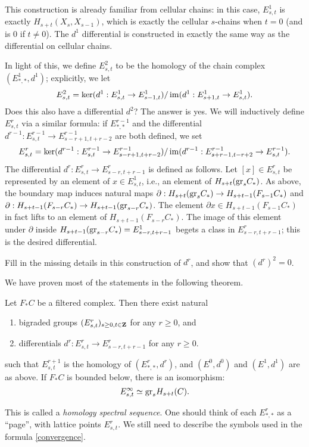 This construction is already familiar from cellular chains: in this case,
$E^1_{s,t}$ is exactly $H_{s+t}(X_{s},X_{s-1})$, which is exactly the cellular
$s$-chains when $t=0$ (and is $0$ if $t\neq 0$). The $d^1$ differential is
constructed in exactly the same way as the differential on cellular chains.

In light of this, we define $E^2_{s,t}$ to be the homology of the chain complex
$(E^1_{\ast,\ast}, d^1)$; explicitly, we let
$$E^2_{s,t} = \ker(d^1:E^1_{s,t}\to E^1_{s-1,t})/\operatorname{im}(d^1:E^1_{s+1,t}\to
E^1_{s,t}).$$
Does this also have a differential $d^2$? The answer is yes. We will
inductively define $E^r_{s,t}$ via a similar formula: if $E^{r-1}_{\ast,\ast}$
and the differential $d^{r-1}:E^{r-1}_{s,t}\to E^{r-1}_{s-r+1,t+r-2}$ are both
defined, we set
$$E^{r}_{s,t} = \ker(d^{r-1}:E^{r-1}_{s,t}\to
E^{r-1}_{s-r+1,t+r-2})/\operatorname{im}(d^{r-1}:E^{r-1}_{s+r-1,t-r+2}\to E^{r-1}_{s,t}).$$
The differential $d^{r}:E^{r}_{s,t}\to E^{r}_{s-r,t+r-1}$ is defined as
follows. Let $[x]\in E^r_{s,t}$ be represented by an element of $x\in
E^1_{s,t}$, i.e., an element of $H_{s+t}(\mathrm{gr}_s C_\ast)$. As above, the boundary
map induces natural maps $\partial:H_{s+t}(\mathrm{gr}_s C_\ast)\to H_{s+t-1}(F_{s-1}
C_\ast)$ and $\partial:H_{s+t-1}(F_{s-r} C_\ast)\to H_{s+t-1}(\mathrm{gr}_{s-r}
C_\ast)$. The element $\partial x\in H_{s+t-1}(F_{s-1} C_\ast)$ in fact lifts
to an element of $H_{s+t-1}(F_{s-r} C_\ast)$. The image of this element under
$\partial$ inside $H_{s+t-1}(\mathrm{gr}_{s-r} C_\ast) = E^1_{s-r,t+r-1}$ begets a
class in $E^r_{s-r,t+r-1}$; this is the desired differential.
\begin{exercise}
    Fill in the missing details in this construction of $d^r$, and show that
    $(d^r)^2 = 0$.
\end{exercise}
We have proven most of the statements in the following theorem.
\begin{theorem}\label{filtered-sseq}
    Let $F_\ast C$ be a filtered complex. Then there exist natural
    \begin{enumerate}
	\item bigraded groups $(E^r_{s,t})_{s\geq 0, t\in\mathbf Z}$ for any $r\geq
	    0$, and
	\item differentials $d^r:E^r_{s,t} \to E^r_{s-r,t+r - 1}$ for any
	    $r\geq 0$.
    \end{enumerate}
    such that $E^{r+1}_{s,t}$ is the homology of $(E^r_{\ast,\ast},d^r)$, and
    $(E^0, d^0)$ and $(E^1, d^1)$ are as above. If $F_\ast C$ is bounded
    below, there is an isomorphism:
    \begin{equation}\label{convergence}
	E^\infty_{s,t} \simeq \mathrm{gr}_s H_{s+t}(C).
    \end{equation}
\end{theorem}
This is called a \emph{homology spectral sequence}. One should think of each
$E^r_{\ast,\ast}$ as a ``page'', with lattice points $E^r_{s,t}$. We still need
to describe the symbols used in the formula \eqref{convergence}.

